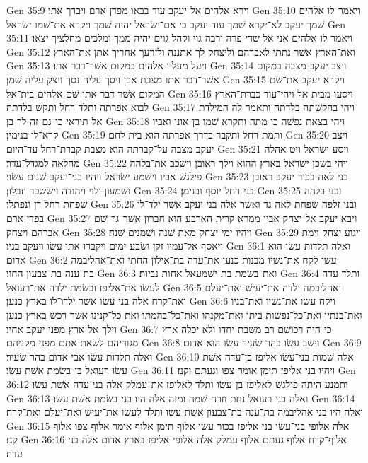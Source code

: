 Gen 35:9  וירא אלהים אל־יעקב עוד בבאו מפדן ארם ויברך אתו׃
Gen 35:10  ויאמר־לו אלהים שׁמך יעקב לא־יקרא שׁמך עוד יעקב כי אם־ישׂראל יהיה שׁמך ויקרא את־שׁמו ישׂראל׃
Gen 35:11  ויאמר לו אלהים אני אל שׁדי פרה ורבה גוי וקהל גוים יהיה ממך ומלכים מחלציך יצאו׃
Gen 35:12  ואת־הארץ אשׁר נתתי לאברהם וליצחק לך אתננה ולזרעך אחריך אתן את־הארץ׃
Gen 35:13  ויעל מעליו אלהים במקום אשׁר־דבר אתו׃
Gen 35:14  ויצב יעקב מצבה במקום אשׁר־דבר אתו מצבת אבן ויסך עליה נסך ויצק עליה שׁמן׃
Gen 35:15  ויקרא יעקב את־שׁם המקום אשׁר דבר אתו שׁם אלהים בית־אל׃
Gen 35:16  ויסעו מבית אל ויהי־עוד כברת־הארץ לבוא אפרתה ותלד רחל ותקשׁ בלדתה׃
Gen 35:17  ויהי בהקשׁתה בלדתה ותאמר לה המילדת אל־תיראי כי־גם־זה לך בן׃
Gen 35:18  ויהי בצאת נפשׁה כי מתה ותקרא שׁמו בן־אוני ואביו קרא־לו בנימין׃
Gen 35:19  ותמת רחל ותקבר בדרך אפרתה הוא בית לחם׃
Gen 35:20  ויצב יעקב מצבה על־קברתה הוא מצבת קברת־רחל עד־היום׃
Gen 35:21  ויסע ישׂראל ויט אהלה מהלאה למגדל־עדר׃
Gen 35:22  ויהי בשׁכן ישׂראל בארץ ההוא וילך ראובן וישׁכב את־בלהה פילגשׁ אביו וישׁמע ישׂראל ויהיו בני־יעקב שׁנים עשׂר׃
Gen 35:23  בני לאה בכור יעקב ראובן ושׁמעון ולוי ויהודה וישׂשכר וזבלון׃
Gen 35:24  בני רחל יוסף ובנימן׃
Gen 35:25  ובני בלהה שׁפחת רחל דן ונפתלי׃
Gen 35:26  ובני זלפה שׁפחת לאה גד ואשׁר אלה בני יעקב אשׁר ילד־לו בפדן ארם׃
Gen 35:27  ויבא יעקב אל־יצחק אביו ממרא קרית הארבע הוא חברון אשׁר־גר־שׁם אברהם ויצחק׃
Gen 35:28  ויהיו ימי יצחק מאת שׁנה ושׁמנים שׁנה׃
Gen 35:29  ויגוע יצחק וימת ויאסף אל־עמיו זקן ושׂבע ימים ויקברו אתו עשׂו ויעקב בניו׃
Gen 36:1  ואלה תלדות עשׂו הוא אדום׃
Gen 36:2  עשׂו לקח את־נשׁיו מבנות כנען את־עדה בת־אילון החתי ואת־אהליבמה בת־ענה בת־צבעון החוי׃
Gen 36:3  ואת־בשׂמת בת־ישׁמעאל אחות נביות׃
Gen 36:4  ותלד עדה לעשׂו את־אליפז ובשׂמת ילדה את־רעואל׃
Gen 36:5  ואהליבמה ילדה את־יעישׁ ואת־יעלם ואת־קרח אלה בני עשׂו אשׁר ילדו־לו בארץ כנען׃
Gen 36:6  ויקח עשׂו את־נשׁיו ואת־בניו ואת־בנתיו ואת־כל־נפשׁות ביתו ואת־מקנהו ואת־כל־בהמתו ואת כל־קנינו אשׁר רכשׁ בארץ כנען וילך אל־ארץ מפני יעקב אחיו׃
Gen 36:7  כי־היה רכושׁם רב משׁבת יחדו ולא יכלה ארץ מגוריהם לשׂאת אתם מפני מקניהם׃
Gen 36:8  וישׁב עשׂו בהר שׂעיר עשׂו הוא אדום׃
Gen 36:9  ואלה תלדות עשׂו אבי אדום בהר שׂעיר׃
Gen 36:10  אלה שׁמות בני־עשׂו אליפז בן־עדה אשׁת עשׂו רעואל בן־בשׂמת אשׁת עשׂו׃
Gen 36:11  ויהיו בני אליפז תימן אומר צפו וגעתם וקנז׃
Gen 36:12  ותמנע היתה פילגשׁ לאליפז בן־עשׂו ותלד לאליפז את־עמלק אלה בני עדה אשׁת עשׂו׃
Gen 36:13  ואלה בני רעואל נחת וזרח שׁמה ומזה אלה היו בני בשׂמת אשׁת עשׂו׃
Gen 36:14  ואלה היו בני אהליבמה בת־ענה בת־צבעון אשׁת עשׂו ותלד לעשׂו את־יעישׁ ואת־יעלם ואת־קרח׃
Gen 36:15  אלה אלופי בני־עשׂו בני אליפז בכור עשׂו אלוף תימן אלוף אומר אלוף צפו אלוף קנז׃
Gen 36:16  אלוף־קרח אלוף געתם אלוף עמלק אלה אלופי אליפז בארץ אדום אלה בני עדה׃
